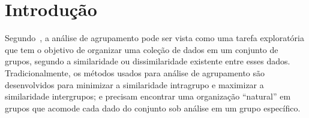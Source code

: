 \documentclass[
    12pt,                %
    oneside,            %
    a4paper,            %
    english,            %
    brazil                %
    ]{abntex2ppgsi}
\begin{document}
\tableofcontents*
\cleardoublepage



\textual



%
%
%




\chapter{Introdução}

Segundo~, a análise de agrupamento pode ser vista como uma tarefa exploratória que tem o objetivo de organizar uma coleção de dados em um conjunto de grupos, segundo a similaridade ou dissimilaridade existente entre esses dados. Tradicionalmente, os métodos usados para análise de agrupamento são desenvolvidos para minimizar a similaridade intragrupo e maximizar a similaridade intergrupos; e precisam encontrar uma organização ``natural'' em grupos que acomode cada dado do conjunto sob análise em um grupo específico.
\end{document}
